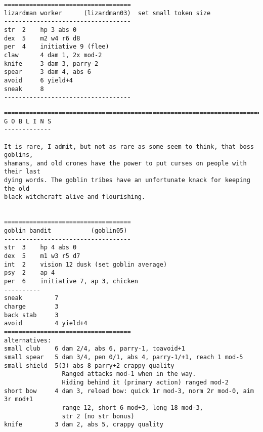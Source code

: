 \goodbreak \begin{samepage} \small \begin{verbatim}
===================================
lizardman worker      (lizardman03)  set small token size
-----------------------------------
str  2    hp 3 abs 0
dex  5    m2 w4 r6 d8
per  4    initiative 9 (flee)
claw      4 dam 1, 2x mod-2
knife     3 dam 3, parry-2
spear     3 dam 4, abs 6
avoid     6 yield+4
sneak     8
-----------------------------------
\end{verbatim} \normalsize \end{samepage}






\goodbreak
{}


\goodbreak \begin{samepage} \small \begin{verbatim}
================================================================================
G O B L I N S
-------------

It is rare, I admit, but not as rare as some seem to think, that boss goblins,
shamans, and old crones have the power to put curses on people with their last
dying words. The goblin tribes have an unfortunate knack for keeping the old
black witchcraft alive and flourishing.


===================================
goblin bandit           (goblin05)
-----------------------------------
str  3    hp 4 abs 0
dex  5    m1 w3 r5 d7
int  2    vision 12 dusk (set goblin average)
psy  2    ap 4
per  6    initiative 7, ap 3, chicken
----------
sneak         7
charge        3
back stab     3
avoid         4 yield+4
===================================
alternatives:
small club    6 dam 2/4, abs 6, parry-1, toavoid+1
small spear   5 dam 3/4, pen 0/1, abs 4, parry-1/+1, reach 1 mod-5
small shield  5(3) abs 8 parry+2 crappy quality
                Ranged attacks mod-1 when in the way.
                Hiding behind it (primary action) ranged mod-2
short bow     4 dam 3, reload bow: quick 1r mod-3, norm 2r mod-0, aim 3r mod+1
                range 12, short 6 mod+3, long 18 mod-3,
                str 2 (no str bonus)
knife         3 dam 2, abs 5, crappy quality
\end{verbatim} \normalsize \end{samepage}

